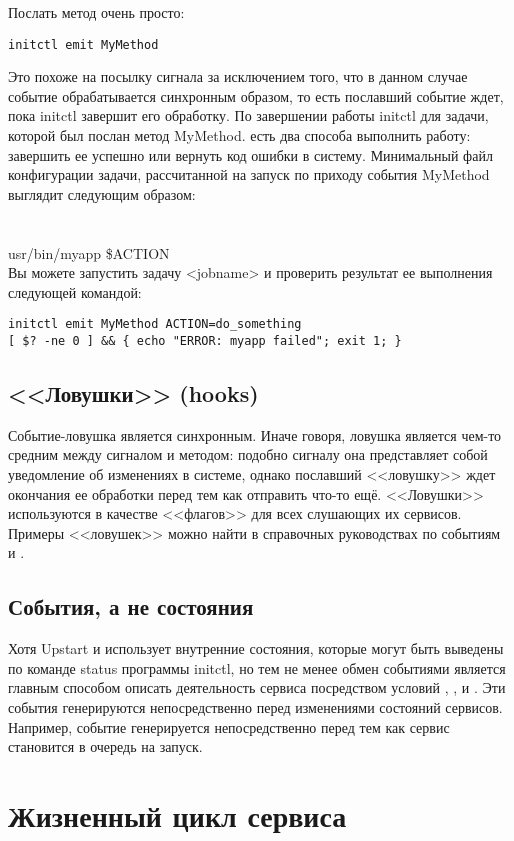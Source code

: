 Послать метод очень просто: \begin{verbatim}
initctl emit MyMethod
\end{verbatim} Это похоже на посылку сигнала за исключением того, что в данном случае событие обрабатывается синхронным образом, то есть пославший событие ждет, пока initctl завершит его обработку. По завершении работы initctl для задачи, которой был послан метод MyMethod. есть два способа выполнить работу: завершить ее успешно или вернуть код ошибки в систему. Минимальный файл конфигурации задачи, рассчитанной на запуск по приходу события MyMethod выглядит следующим образом: \\
 \\
 \\
 \/usr/bin/myapp \$ACTION \\

Вы можете запустить задачу <jobname> и проверить результат ее выполнения следующей командой: \begin{verbatim}
initctl emit MyMethod ACTION=do_something
[ $? -ne 0 ] && { echo "ERROR: myapp failed"; exit 1; }
\end{verbatim} 
\subsection*{<<Ловушки>> (hooks)}
Событие-ловушка является синхронным. Иначе говоря, ловушка является чем-то средним между сигналом и методом: подобно сигналу она представляет собой уведомление об изменениях в системе, однако пославший <<ловушку>> ждет окончания ее обработки перед тем как отправить что-то ещё. <<Ловушки>> используются в качестве <<флагов>> для всех слушающих их сервисов. Примеры <<ловушек>> можно найти в справочных руководствах по событиям  и . 
\subsection*{События, а не состояния}
Хотя Upstart и использует внутренние состояния, которые могут быть выведены по команде status программы initctl,  но тем не менее обмен событиями является главным способом описать деятельность сервиса посредством условий , ,  и . Эти события 
генерируются непосредственно перед изменениями состояний сервисов. Например, событие  генерируется непосредственно перед тем как сервис становится в очередь на запуск.
\section{Жизненный цикл сервиса}
